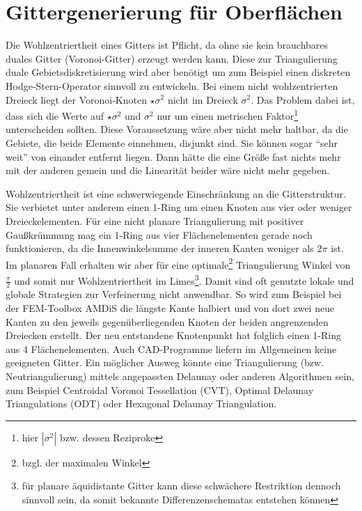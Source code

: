 \section{Gittergenerierung für Oberflächen}
\label{secGittergenerierung}


  \begin{ziel}
    Die Wohlzentriertheit eines Gitters ist Pflicht, da ohne sie kein brauchbares duales Gitter (Voronoi-Gitter) erzeugt werden kann. 
    Diese zur Triangulierung duale Gebietsdiskretisierung wird aber benötigt um zum Beispiel einen 
    diskreten Hodge-Stern-Operator sinnvoll zu entwickeln. 
    Bei einem nicht wohlzentrierten Dreieck liegt der Voronoi-Knoten \( \star\sigma^{2} \) nicht im Dreieck \( \sigma^{2} \).
    Das Problem dabei ist, dass sich die Werte auf \( \star\sigma^{2} \) und \( \sigma^{2} \) nur um einen 
    metrischen Faktor\footnote{hier \( |\sigma^{2}| \) bzw. dessen Reziproke} unterscheiden sollten.
    Diese Voraussetzung wäre aber nicht mehr haltbar, da die Gebiete, die beide Elemente einnehmen, disjunkt sind. 
    Sie können sogar  "`sehr weit"'
    von einander entfernt liegen.
    Dann hätte die eine Größe fast nichts mehr mit der anderen gemein und die Linearität beider wäre nicht mehr gegeben.

    Wohlzentriertheit ist eine schwerwiegende Einschränkung an die Gitterstruktur. Sie verbietet unter anderem einen 1-Ring um einen Knoten
    aus vier oder weniger Dreieckelementen.
    Für eine nicht planare Triangulierung mit positiver Gaußkrümmung mag ein 1-Ring aus vier Flächenelementen gerade noch funktionieren, da die Innenwinkelsumme der inneren Kanten weniger als \( 2\pi \) ist.
    Im planaren Fall erhalten wir aber für eine optimale\footnote{bzgl. der maximalen Winkel} Triangulierung Winkel von \( \frac{\pi}{2} \) 
    und somit nur Wohlzentriertheit im Limes\footnote{für planare äquidistante Gitter kann diese schwächere Restriktion dennoch sinnvoll sein, da somit bekannte Differenzenschematas entstehen können}.
    Damit sind oft genutzte lokale und globale Strategien zur Verfeinerung nicht anwendbar. 
    So wird zum Beispiel bei der FEM-Toolbox AMDiS \cite{amdis} die längste Kante halbiert und von dort zwei neue Kanten zu den jeweils gegenüberliegenden Knoten der beiden angrenzenden Dreiecken erstellt. Der neu entstandene Knotenpunkt hat folglich einen 1-Ring aus 4 Flächenelementen.
    Auch CAD-Programme liefern im Allgemeinen keine geeigneten Gitter. 
    Ein möglicher Ausweg könnte eine Triangulierung (bzw. Neutriangulierung) mittels angepassten Delaunay oder anderen Algorithmen sein, zum Beispiel Centroidal Voronoi Tessellation (CVT)\cite{CVTGunzburger}, 
    Optimal Delaunay Triangulations (ODT)\cite{ODT} oder Hexagonal Delaunay Triangulation\cite{HDT}.


\end{ziel}
